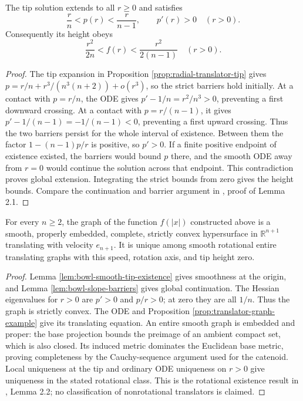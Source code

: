 \begin{lemma}\label{lem:bowl-slope-barriers}
The tip solution extends to all $r\geq0$ and satisfies
\[
 \frac rn<p(r)<\frac r{n-1},\qquad p'(r)>0\quad(r>0).
\]
Consequently its height obeys
\[
 \frac{r^2}{2n}<f(r)<\frac{r^2}{2(n-1)}\quad(r>0).
\]
\end{lemma}
\begin{proof}
The tip expansion in Proposition \ref{prop:radial-translator-tip} gives $p=r/n+r^3/(n^3(n+2))+o(r^3)$, so the strict barriers hold initially. At a contact with $p=r/n$, the ODE gives $p'-1/n=r^2/n^3>0$, preventing a first downward crossing. At a contact with $p=r/(n-1)$, it gives $p'-1/(n-1)=-1/(n-1)<0$, preventing a first upward crossing. Thus the two barriers persist for the whole interval of existence. Between them the factor $1-(n-1)p/r$ is positive, so $p'>0$. If a finite positive endpoint of existence existed, the barriers would bound $p$ there, and the smooth ODE away from $r=0$ would continue the solution across that endpoint. This contradiction proves global extension. Integrating the strict bounds from zero gives the height bounds. Compare the continuation and barrier argument in \cite{CSS07}, proof of Lemma 2.1.
\end{proof}

\begin{theorem}\label{thm:rotational-bowl-construction}
For every $n\geq2$, the graph of the function $f(|x|)$ constructed above is a smooth, properly embedded, complete, strictly convex hypersurface in $\mathbb R^{n+1}$ translating with velocity $e_{n+1}$. It is unique among smooth rotational entire translating graphs with this speed, rotation axis, and tip height zero.
\end{theorem}
\begin{proof}
Lemma \ref{lem:bowl-smooth-tip-existence} gives smoothness at the origin, and Lemma \ref{lem:bowl-slope-barriers} gives global continuation. The Hessian eigenvalues for $r>0$ are $p'>0$ and $p/r>0$; at zero they are all $1/n$. Thus the graph is strictly convex. The ODE and Proposition \ref{prop:translator-graph-example} give its translating equation. An entire smooth graph is embedded and proper: the base projection bounds the preimage of an ambient compact set, which is also closed. Its induced metric dominates the Euclidean base metric, proving completeness by the Cauchy-sequence argument used for the catenoid. Local uniqueness at the tip and ordinary ODE uniqueness on $r>0$ give uniqueness in the stated rotational class. This is the rotational existence result in \cite{CSS07}, Lemma 2.2; no classification of nonrotational translators is claimed.
\end{proof}


